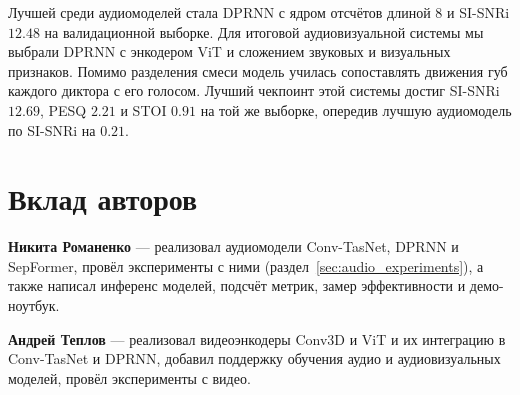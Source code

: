 \documentclass[10pt,conference,compsocconf]{IEEEtran}
\begin{document}
Лучшей среди аудиомоделей стала DPRNN с ядром отсчётов длиной 8 и SI-SNRi $12.48$ на валидационной выборке. Для итоговой аудиовизуальной системы мы выбрали DPRNN с энкодером ViT и сложением звуковых и визуальных признаков. Помимо разделения смеси модель училась сопоставлять движения губ каждого диктора с его голосом. Лучший чекпоинт этой системы достиг SI-SNRi $12.69$, PESQ $2.21$ и STOI $0.91$ на той же выборке, опередив лучшую аудиомодель по SI-SNRi на $0.21$.

\section*{Вклад авторов}
\noindent\textbf{Никита Романенко} --- реализовал аудиомодели Conv-TasNet, DPRNN и SepFormer, провёл эксперименты с ними (раздел~\ref{sec:audio_experiments}), а также написал инференс моделей, подсчёт метрик, замер эффективности и демо-ноутбук.\par

\noindent\textbf{Андрей Теплов} --- реализовал видеоэнкодеры Conv3D и ViT и их интеграцию в Conv-TasNet и DPRNN, добавил поддержку обучения аудио и аудиовизуальных моделей, провёл эксперименты с видео.\par



\end{document}
